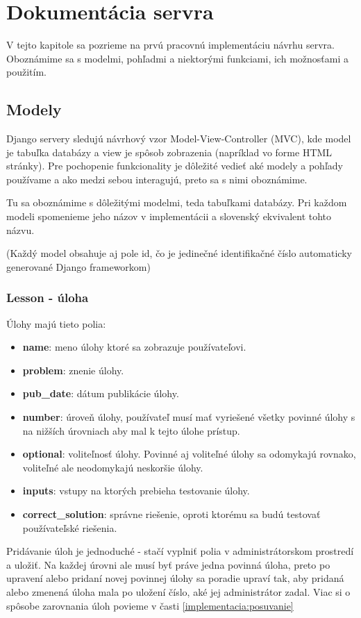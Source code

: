 \chapter{Dokumentácia servra}
\label{kap:doc}
V tejto kapitole sa pozrieme na prvú pracovnú implementáciu návrhu servra. Oboznámime sa
s modelmi, pohľadmi a niektorými funkciami, ich možnosťami a použitím.
\section{Modely}
\label{modely}
Django servery sledujú návrhový vzor Model-View-Controller (MVC), kde model je tabuľka
databázy a view je spôsob zobrazenia (napríklad vo forme HTML stránky). Pre pochopenie
funkcionality je dôležité vedieť aké modely a pohľady používame a ako medzi sebou interagujú,
preto sa s nimi oboznámime.

Tu sa oboznámime s dôležitými modelmi, teda tabuľkami databázy.
Pri každom modeli spomenieme jeho názov v implementácii a slovenský ekvivalent tohto názvu.

(Každý model obsahuje aj pole id, čo je jedinečné identifikačné číslo automaticky generované
Django frameworkom)
\subsection{Lesson - úloha}
\label{doc:lesson}
Úlohy majú tieto polia:
\begin{itemize}
\itemsep0em
\item \textbf{name}: meno úlohy ktoré sa zobrazuje používateľovi.
\item \textbf{problem}: znenie úlohy.
\item \textbf{pub\_date}: dátum publikácie úlohy.
\item \textbf{number}: úroveň úlohy, používateľ musí mať vyriešené všetky povinné úlohy s
  na nižších úrovniach aby mal k tejto úlohe prístup.
\item \textbf{optional}: voliteľnosť úlohy. Povinné aj voliteľné úlohy sa odomykajú rovnako, voliteľné
   ale neodomykajú neskoršie úlohy.
\item \textbf{inputs}: vstupy na ktorých prebieha testovanie úlohy.
\item \textbf{correct\_solution}: správne riešenie, oproti ktorému sa budú testovať používateľské
   riešenia.
\end{itemize}

Pridávanie úloh je jednoduché - stačí vyplniť polia v administrátorskom prostredí
a uložiť. Na každej úrovni ale musí byť práve jedna povinná úloha, preto po upravení
alebo pridaní novej povinnej úlohy sa poradie upraví tak, aby pridaná alebo zmenená úloha mala
po uložení číslo, aké jej administrátor zadal. Viac si o spôsobe zarovnania úloh povieme v časti
\ref{implementacia:posuvanie}

